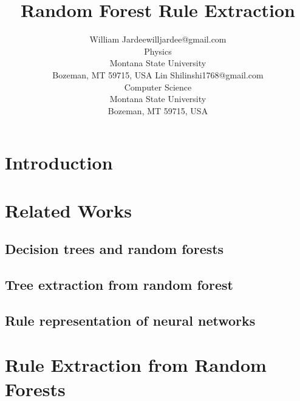 \documentclass[10pt]{article}
\begin{document}
\title{Random Forest Rule Extraction}

\author{\name William Jardee\email willjardee@gmail.com \\
       \addr Physics\\
       Montana State University\\
       Bozeman, MT 59715, USA\AND
       \name Lin Shi\email linshi1768@gmail.com\\
       \addr Computer Science\\
       Montana State University\\
       Bozeman, MT 59715, USA
       }

\maketitle

\begin{abstract}%

\end{abstract}
 
\section{Introduction}
\label{sec:intro}



\section{Related Works}
\label{sec:related works}
\subsection{Decision trees and random forests}
\subsection{Tree extraction from random forest}
\subsection{Rule representation of neural networks}



\section{Rule Extraction from Random Forests}
\label{sec:alg}
\end{document}
